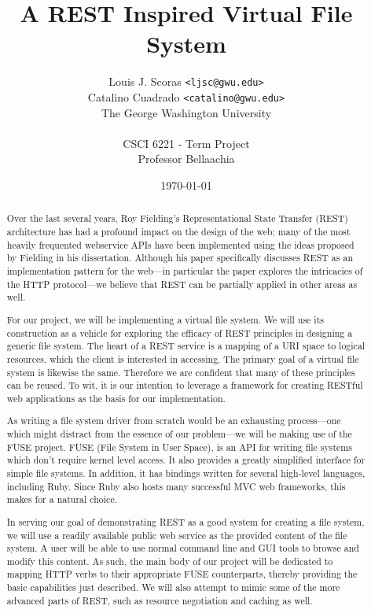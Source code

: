 \documentclass{article}
\begin{document}
\renewcommand{\bfdefault}{sbc}

\title{A REST Inspired Virtual File System}
\author{Louis J. Scoras \texttt{<ljsc@gwu.edu>}\\
Catalino Cuadrado \texttt{<catalino@gwu.edu>}\\
The George Washington University\\
\\
CSCI 6221 - Term Project\\
Professor Bellaachia}
\date{\today}
\maketitle

\begin{abstract}

Over the last several years, Roy Fielding's Representational State Transfer
(REST) architecture \nocite{Fie00} has had a profound impact on the design of
the web; many of the most heavily frequented webservice APIs have been
implemented using the ideas proposed by Fielding in his dissertation. Although
his paper specifically discusses REST as an implementation pattern for the
web---in particular the paper explores the intricacies of the HTTP protocol---we
believe that REST can be partially applied in other areas as well.

For our project, we will be implementing a virtual file system. We will use its
construction as a vehicle for exploring the efficacy of REST principles in
designing a generic file system. The heart of a REST service is a mapping of a
URI space to logical resources, which the client is interested in accessing.
The primary goal of a virtual file system is likewise the same. Therefore we are
confident that many of these principles can be reused. To wit, it is our
intention to leverage a framework for creating RESTful web applications as the
basis for our implementation.

As writing a file system driver from scratch would be an exhausting
process---one which might distract from the essence of our problem---we will be
making use of the FUSE project. FUSE (File System in User Space), is an API for
writing file systems which don't require kernel level access. It also provides a
greatly simplified interface for simple file systems. In addition, it has
bindings written for several high-level languages, including Ruby. Since Ruby
also hosts many successful MVC web frameworks, this makes for a natural choice.

In serving our goal of demonstrating REST as a good system for creating a file
system, we will use a readily available public web service as the provided
content of the file system. A user will be able to use normal command line and
GUI tools to browse and modify this content. As such, the main body of our
project will be dedicated to mapping HTTP verbs to their appropriate FUSE
counterparts, thereby providing the basic capabilities just described. We will
also attempt to mimic some of the more advanced parts of REST, such as resource
negotiation and caching as well.

\end{abstract}

\clearpage
\tableofcontents







\end{document}
